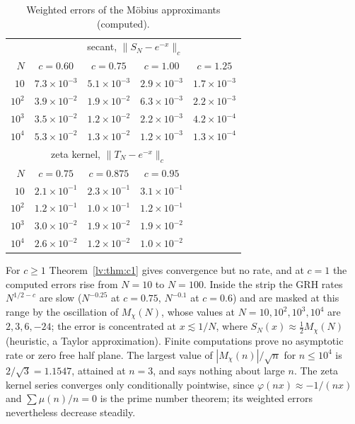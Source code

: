 \begin{table}[h]\centering\footnotesize
\begin{tabular}{rcccc}
\toprule
& \multicolumn{4}{c}{secant, $\|S_N-e^{-x}\|_c$}\\
$N$ & $c=0.60$ & $c=0.75$ & $c=1.00$ & $c=1.25$\\
\midrule
$10$ & $7.3\times10^{-3}$ & $5.1\times10^{-3}$ & $2.9\times10^{-3}$ & $1.7\times10^{-3}$\\
$10^2$ & $3.9\times10^{-2}$ & $1.9\times10^{-2}$ & $6.3\times10^{-3}$ & $2.2\times10^{-3}$\\
$10^3$ & $3.5\times10^{-2}$ & $1.2\times10^{-2}$ & $2.2\times10^{-3}$ & $4.2\times10^{-4}$\\
$10^4$ & $5.3\times10^{-2}$ & $1.3\times10^{-2}$ & $1.2\times10^{-3}$ & $1.3\times10^{-4}$\\
\midrule
& \multicolumn{3}{c}{zeta kernel, $\|T_N-e^{-x}\|_c$}\\
$N$ & $c=0.75$ & $c=0.875$ & $c=0.95$\\
\midrule
$10$ & $2.1\times10^{-1}$ & $2.3\times10^{-1}$ & $3.1\times10^{-1}$\\
$10^2$ & $1.2\times10^{-1}$ & $1.0\times10^{-1}$ & $1.2\times10^{-1}$\\
$10^3$ & $3.0\times10^{-2}$ & $1.9\times10^{-2}$ & $1.9\times10^{-2}$\\
$10^4$ & $2.6\times10^{-2}$ & $1.2\times10^{-2}$ & $1.0\times10^{-2}$\\
\bottomrule
\end{tabular}
\caption{Weighted errors of the M\"obius approximants (computed).}\label{lv:tab:secant}
\end{table}

For $c\ge1$ Theorem~\ref{lv:thm:c1} gives convergence but no rate, and at $c=1$ the computed errors rise from $N=10$ to $N=100$. Inside the strip the GRH rates $N^{1/2-c}$ are slow ($N^{-0.25}$ at $c=0.75$, $N^{-0.1}$ at $c=0.6$) and are masked at this range by the oscillation of $M_\chi(N)$, whose values at $N=10,10^2,10^3,10^4$ are $2,3,6,-24$; the error is concentrated at $x\lesssim1/N$, where $S_N(x)\approx\frac12M_\chi(N)$ (heuristic, a Taylor approximation). Finite computations prove no asymptotic rate or zero free half plane. The largest value of $|M_\chi(n)|/\sqrt n$ for $n\le10^4$ is $2/\sqrt3=1.1547$, attained at $n=3$, and says nothing about large $n$. The zeta kernel series converges only conditionally pointwise, since $\varphi(nx)\approx-1/(nx)$ and $\sum\mu(n)/n=0$ is the prime number theorem; its weighted errors nevertheless decrease steadily.
